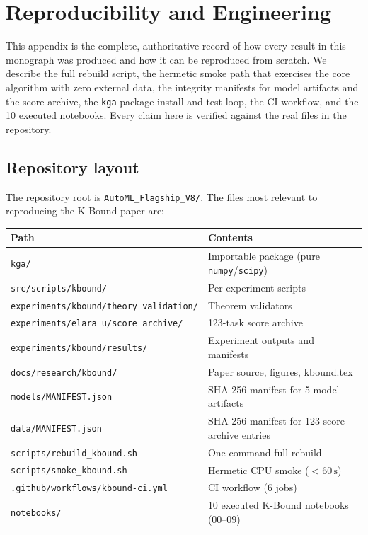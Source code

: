 \chapter{Reproducibility and Engineering}\label{app:repro}

This appendix is the complete, authoritative record of how every result in
this monograph was produced and how it can be reproduced from scratch.  We
describe the full rebuild script, the hermetic smoke path that exercises the
core algorithm with zero external data, the integrity manifests for model
artifacts and the score archive, the \texttt{kga} package install and test
loop, the CI workflow, and the 10 executed notebooks.  Every claim here is
verified against the real files in the repository.

\section{Repository layout}
\label{sec:app-repro-layout}

The repository root is \texttt{AutoML\_Flagship\_V8/}.  The files most relevant
to reproducing the K-Bound paper are:

\begin{center}
\begin{tabular}{ll}
\toprule
Path & Contents \\
\midrule
\texttt{kga/} & Importable \KGA{} package (pure \texttt{numpy}/\texttt{scipy}) \\
\texttt{src/scripts/kbound/} & Per-experiment scripts \\
\texttt{experiments/kbound/theory\_validation/} & Theorem validators \\
\texttt{experiments/elara\_u/score\_archive/} & 123-task score archive \\
\texttt{experiments/kbound/results/} & Experiment outputs and manifests \\
\texttt{docs/research/kbound/} & Paper source, figures, kbound.tex \\
\texttt{models/MANIFEST.json} & SHA-256 manifest for 5 model artifacts \\
\texttt{data/MANIFEST.json} & SHA-256 manifest for 123 score-archive entries \\
\texttt{scripts/rebuild\_kbound.sh} & One-command full rebuild \\
\texttt{scripts/smoke\_kbound.sh} & Hermetic CPU smoke ($< 60\,\mathrm{s}$) \\
\texttt{.github/workflows/kbound-ci.yml} & CI workflow (6 jobs) \\
\texttt{notebooks/} & 10 executed K-Bound notebooks (00--09) \\
\bottomrule
\end{tabular}
\end{center}

